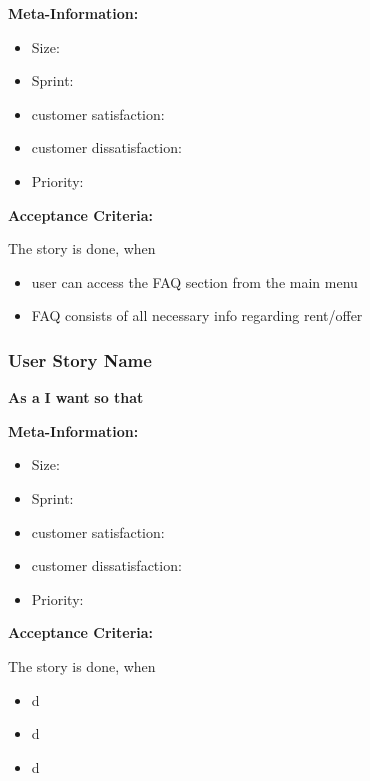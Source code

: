 \textbf{Meta-Information:}
\begin{itemize}
    \item Size:
    \item Sprint:
    \item customer satisfaction:
    \item customer dissatisfaction:
    \item Priority:
\end{itemize}

\textbf{Acceptance Criteria:}

The story is done, when
\begin{itemize}
    \item user can access the FAQ section from the main menu
    \item FAQ consists of all necessary info regarding rent/offer
\end{itemize}

\subsubsection{User Story Name}

\textbf{As a}\hfill\break
\textbf{I want}\hfill\break
\textbf{so that}

\textbf{Meta-Information:}
\begin{itemize}
    \item Size:
    \item Sprint:
    \item customer satisfaction:
    \item customer dissatisfaction:
    \item Priority:
\end{itemize}

\textbf{Acceptance Criteria:}

The story is done, when
\begin{itemize}
    \item d
    \item d
    \item d
\end{itemize}